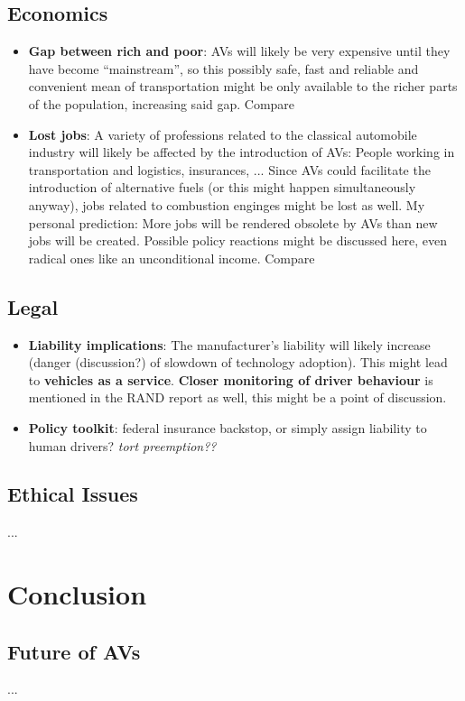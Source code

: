 \documentclass[11pt]{article}
\begin{document}
\subsection{Economics}
\begin{itemize}
\item \textbf{Gap between rich and poor}: AVs will likely be very expensive until they have become ``mainstream'', so this possibly safe, fast and reliable and convenient mean of transportation might be only available to the richer parts of the population, increasing said gap. Compare \cite[p. 39]{Rand:16}
\item \textbf{Lost jobs}: A variety of professions related to the classical automobile industry will likely be affected by the introduction of AVs: People working in transportation and logistics, insurances, ... Since AVs could facilitate the introduction of alternative fuels (or this might happen simultaneously anyway), jobs related to combustion enginges might be lost as well. My personal prediction: More jobs will be rendered obsolete by AVs than new jobs will be created. Possible policy reactions might be discussed here, even radical ones like an unconditional income. Compare \cite[p. 40ff]{Rand:16}
\end{itemize}
\subsection{Legal}
\begin{itemize}
\item \textbf{Liability implications}: The manufacturer's liability will likely increase (danger (discussion?) of slowdown of technology adoption). This might lead to \textbf{vehicles as a service}. \textbf{Closer monitoring of driver behaviour} is mentioned in the RAND report as well, this might be a point of discussion.
\item \textbf{Policy toolkit}: federal insurance backstop, or simply assign liability to human drivers? \textit{tort preemption??}
\end{itemize}

\subsection{Ethical Issues}
...

\section{Conclusion}
\subsection{Future of AVs}
...
\end{document}
